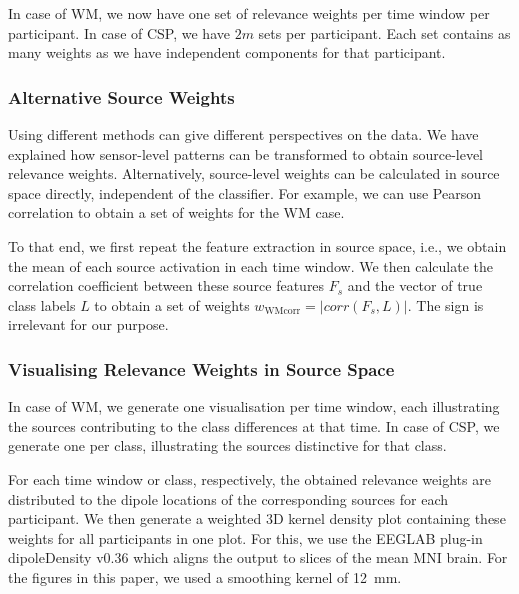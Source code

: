 In case of WM, we now have one set of relevance weights per time window per participant. In case of CSP, we have  $2m$ sets per participant. Each set contains as many weights as we have independent components for that participant.


\subsubsection{Alternative Source Weights}
\label{visualisation:alternative}

Using different methods can give different perspectives on the data. We have explained how sensor-level patterns can be transformed to obtain source-level relevance weights. Alternatively, source-level weights can be calculated in source space directly, independent of the classifier. For example, we can use Pearson correlation to obtain a set of weights for the WM case.

To that end, we first repeat the feature extraction in source space, i.e., we obtain the mean of each source activation in each time window. We then calculate the correlation coefficient between these source features $F_s$ and the vector of true class labels $L$ to obtain a set of weights $w_\textrm{WMcorr} = |corr(F_s,L)|$. The sign is irrelevant for our purpose. 


\subsubsection{Visualising Relevance Weights in Source Space}

In case of WM, we generate one visualisation per time window, each illustrating the sources contributing to the class differences at that time. In case of CSP, we generate one per class, illustrating the sources distinctive for that class.

For each time window or class, respectively, the obtained relevance weights are distributed to the dipole locations of the corresponding sources for each participant. We then generate a weighted 3D kernel density plot containing these weights for all participants in one plot. For this, we use the EEGLAB plug-in dipoleDensity v0.36 \cite{miyakoshi2013dipdens} which aligns the output to slices of the mean MNI brain. For the figures in this paper, we used a smoothing kernel of 12~mm. 

